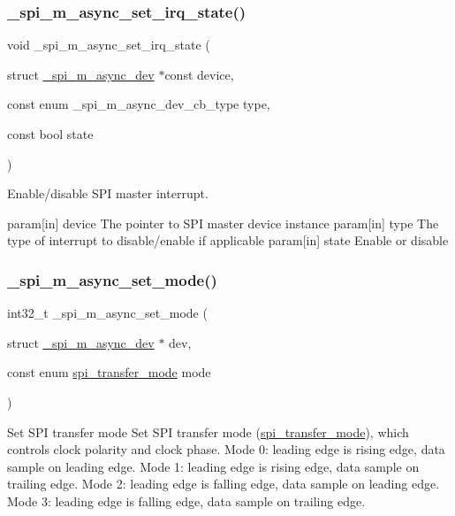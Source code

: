 \subsubsection{\texorpdfstring{\+\_\+spi\+\_\+m\+\_\+async\+\_\+set\+\_\+irq\+\_\+state()}{\_spi\_m\_async\_set\_irq\_state()}}
{\footnotesize\ttfamily void \+\_\+spi\+\_\+m\+\_\+async\+\_\+set\+\_\+irq\+\_\+state (\begin{DoxyParamCaption}\item[{struct \hyperlink{group__hpl__spi_gaab37ebaab3686617eb20d5d175e82e6a}{\+\_\+spi\+\_\+m\+\_\+async\+\_\+dev} $\ast$const}]{device,  }\item[{const enum \+\_\+spi\+\_\+m\+\_\+async\+\_\+dev\+\_\+cb\+\_\+type}]{type,  }\item[{const bool}]{state }\end{DoxyParamCaption})}



Enable/disable S\+PI master interrupt. 

param\mbox{[}in\mbox{]} device The pointer to S\+PI master device instance param\mbox{[}in\mbox{]} type The type of interrupt to disable/enable if applicable param\mbox{[}in\mbox{]} state Enable or disable \mbox{\label{group__hpl__spi_ga2044d42ba5353a59324da48cebf69e25}} 
\subsubsection{\texorpdfstring{\+\_\+spi\+\_\+m\+\_\+async\+\_\+set\+\_\+mode()}{\_spi\_m\_async\_set\_mode()}}
{\footnotesize\ttfamily int32\+\_\+t \+\_\+spi\+\_\+m\+\_\+async\+\_\+set\+\_\+mode (\begin{DoxyParamCaption}\item[{struct \hyperlink{group__hpl__spi_gaab37ebaab3686617eb20d5d175e82e6a}{\+\_\+spi\+\_\+m\+\_\+async\+\_\+dev} $\ast$}]{dev,  }\item[{const enum \hyperlink{group__hpl__spi_ga9c30fdfffba6be76b4044ccb17b218e5}{spi\+\_\+transfer\+\_\+mode}}]{mode }\end{DoxyParamCaption})}



Set S\+PI transfer mode Set S\+PI transfer mode (\hyperlink{group__hpl__spi_ga9c30fdfffba6be76b4044ccb17b218e5}{spi\+\_\+transfer\+\_\+mode}), which controls clock polarity and clock phase. Mode 0\+: leading edge is rising edge, data sample on leading edge. Mode 1\+: leading edge is rising edge, data sample on trailing edge. Mode 2\+: leading edge is falling edge, data sample on leading edge. Mode 3\+: leading edge is falling edge, data sample on trailing edge. 


